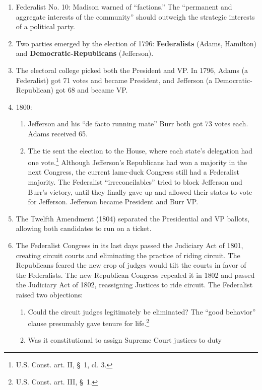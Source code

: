 \begin{enumerate}
    \item Federalist No. 10: Madison warned of ``factions.'' The ``permanent 
    and aggregate interests of the community'' should outweigh the strategic 
    interests of a political party.
    \item Two parties emerged by the election of 1796: \textbf{Federalists} 
    (Adams, Hamilton) and \textbf{Democratic-Republicans} (Jefferson).
    \item The electoral college picked both the President and VP. In 1796, 
    Adams (a Federalist) got 71 votes and became President, and Jefferson (a 
    Democratic-Republican) got 68 and became VP.
    \item 1800:
    \begin{enumerate}
        \item Jefferson and his ``de facto running mate'' Burr both got 73 
        votes each. Adams received 65.
        \item The tie sent the election to the House, where each state's 
        delegation had one vote.\footnote{U.S. Const. art. II, \S\ 1, cl. 3.} 
        Although Jefferson's Republicans had won a majority in the next 
        Congress, the current lame-duck Congress still had a Federalist 
        majority. The Federalist ``irreconcilables'' tried to block Jefferson 
        and Burr's victory, until they finally gave up and allowed their 
        states to vote for Jefferson. Jefferson became President and Burr VP.
    \end{enumerate}
    \item The Twelfth Amendment (1804) separated the Presidential and VP 
    ballots, allowing both candidates to run on a ticket.
    \item The Federalist Congress in its last days passed the Judiciary Act of 
    1801, creating circuit courts and eliminating the practice of riding 
    circuit. The Republicans feared the new crop of judges would tilt the 
    courts in favor of the Federalists. The new Republican Congress repealed 
    it in 1802 and passed the Judiciary Act of 1802, reassigning Justices to 
    ride circuit. The Federalist raised two 
    objections: \begin{enumerate}
        \item Could the circuit judges legitimately be eliminated? The ``good 
        behavior'' clause presumably gave tenure for life.\footnote{U.S. 
        Const. art. III, \S\ 1.}
        \item Was it constitutional to assign Supreme Court justices to duty 

\end{enumerate}
\end{enumerate}
